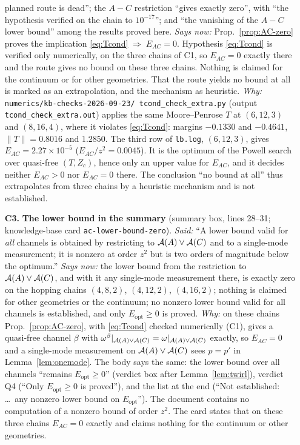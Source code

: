 \documentclass[11pt]{article}
\newcommand{\Erec}{E_{\mathrm{opt}}}
\begin{document}
\begin{enumerate}[leftmargin=2.4em,itemsep=4pt]
 planned route is dead''; the \(A\!-\!C\) restriction ``gives exactly zero'', with
 ``the hypothesis verified on the chain to \(10^{-17}\)''; and ``the vanishing of
 the \(A\!-\!C\) lower bound'' among the results proved here.
 \emph{Says now:} Prop.~\ref{prop:AC-zero} proves the implication
 \eqref{eq:Tcond}\(\;\Rightarrow\;E_{AC}=0\). Hypothesis \eqref{eq:Tcond} is verified
 only numerically, on the three chains of C1, so \(E_{AC}=0\) exactly there and
 the route gives no bound on these three chains. Nothing is claimed for the
 continuum or for other geometries. That the route yields no bound at all is
 marked as an extrapolation, and the mechanism as heuristic.
 \emph{Why:} \texttt{numerics/kb-checks-2026-09-23/\allowbreak
 tcond\_check\_extra.py} (output \texttt{tcond\_check\_extra.out}) applies the same
 Moore--Penrose \(T\) at \((6,12,3)\) and \((8,16,4)\), where it violates
 \eqref{eq:Tcond}: margins \(-0.1330\) and \(-0.4641\), \(\|T\|=0.8016\) and
 \(1.2850\). The third row of \texttt{lb.log}, \((6,12,3)\), gives
 \(E_{AC}=2.27\times10^{-5}\) (\(E_{AC}/z^2=0.0045\)). It is the optimum of the
 Powell search over quasi-free \((T,Z_c)\), hence only an upper value for
 \(E_{AC}\), and it decides neither \(E_{AC}>0\) nor \(E_{AC}=0\) there. The
 conclusion ``no bound at all'' thus extrapolates from three chains by a heuristic
 mechanism and is not established.
\item[\textbf{C3.}] \textbf{The lower bound in the summary} (summary box, lines 28--31;
 knowledge-base card \texttt{ac-lower-bound-zero}).
 \emph{Said:} ``A lower bound valid for \emph{all} channels is obtained by restricting to
 \(\mathcal A(A)\vee\mathcal A(C)\) and to a single-mode measurement; it is nonzero at order \(z^2\) but is
 two orders of magnitude below the optimum.''
 \emph{Says now:} the lower bound from the restriction to \(\mathcal A(A)\vee\mathcal A(C)\), and with it any
 single-mode measurement there, is exactly zero on the hopping chains \((4,8,2)\),
 \((4,12,2)\), \((4,16,2)\); nothing is claimed for other geometries or the continuum; no nonzero
 lower bound valid for all channels is established, and only \(\Erec\ge0\) is proved.
 \emph{Why:} on these chains Prop.~\ref{prop:AC-zero}, with \eqref{eq:Tcond} checked numerically
 (C1), gives a quasi-free channel \(\beta\) with
 \(\omega^\beta|_{\mathcal A(A)\vee\mathcal A(C)}=\omega|_{\mathcal A(A)\vee\mathcal A(C)}\) exactly, so \(E_{AC}=0\) and a
 single-mode measurement on \(\mathcal A(A)\vee\mathcal A(C)\) sees \(p=p'\) in Lemma~\ref{lem:onemode}.  The
 body says the same: the lower bound over all channels ``remains \(\Erec\ge0\)'' (verdict box
 after Lemma~\ref{lem:twirl}), verdict Q4 (``Only \(\Erec\ge0\) is proved''), and the list at the
 end (``Not established: \dots\ any nonzero lower bound on \(\Erec\)'').  The document contains no
 computation of a nonzero bound of order \(z^2\).  The card states that on these three chains
 \(E_{AC}=0\) exactly and claims nothing for the continuum or other geometries.
\end{enumerate}
\end{document}
